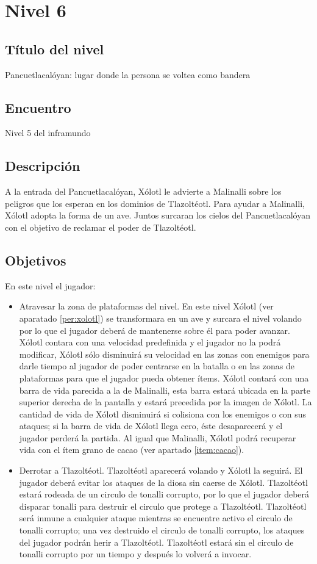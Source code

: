 	\section{Nivel 6} \label{Nivel:Niv06}
	\subsection{Título del nivel}
	Pancuetlacalóyan: lugar donde la persona se voltea como bandera
	\subsection{Encuentro}
	Nivel 5 del inframundo
	\subsection{Descripción}
	A la entrada del Pancuetlacalóyan, Xólotl le advierte a Malinalli sobre los peligros que los esperan en los dominios de Tlazoltéotl. Para ayudar a Malinalli, Xólotl adopta la forma de un ave. Juntos surcaran los cielos del Pancuetlacalóyan con el objetivo de reclamar el poder de Tlazoltéotl.
	\subsection{Objetivos}
	En este nivel el jugador:
	\begin{itemize}
		\item Atravesar la zona de plataformas del nivel. En este nivel Xólotl (ver aparatado \ref{per:xolotl}) se transformara en un ave y surcara el nivel volando por lo que el jugador deberá de mantenerse sobre él para poder avanzar. Xólotl contara con una velocidad predefinida y el jugador no la podrá modificar, Xólotl sólo disminuirá su velocidad en las zonas con enemigos para darle tiempo al jugador de poder centrarse en la batalla o en las zonas de plataformas para que el jugador pueda obtener ítems. Xólotl contará con una barra de vida parecida a la de Malinalli, esta barra estará ubicada en la parte superior derecha de la pantalla y estará precedida por la imagen de Xólotl. La cantidad de vida de Xólotl disminuirá si colisiona con  los enemigos o con sus ataques; si la barra de vida de Xólotl llega cero, éste desaparecerá y el jugador perderá la partida. Al igual que Malinalli, Xólotl podrá recuperar vida con el ítem grano de cacao (ver apartado \ref{item:cacao}).
		\item Derrotar a Tlazoltéotl. Tlazoltéotl aparecerá volando y Xólotl la seguirá. El jugador deberá evitar los ataques de la diosa sin caerse de Xólotl. Tlazoltéotl estará rodeada de un circulo de tonalli corrupto, por lo que el jugador deberá disparar tonalli para destruir el circulo que protege a Tlazoltéotl. Tlazoltéotl será inmune a cualquier ataque mientras se encuentre activo el circulo de tonalli corrupto; una vez destruido el circulo de tonalli corrupto, los ataques del jugador podrán herir a Tlazoltéotl. Tlazoltéotl estará sin el circulo de tonalli corrupto por un tiempo y después lo volverá a invocar. 
	\end{itemize}	 

